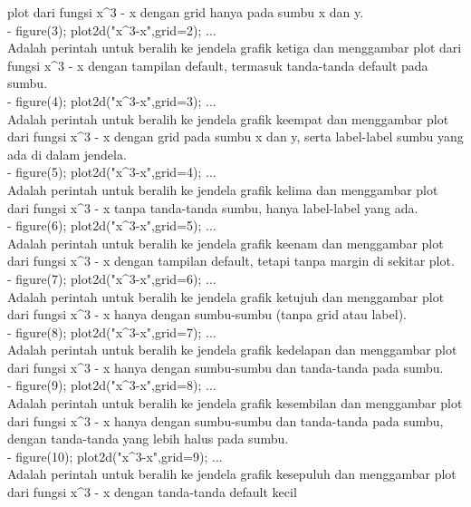 \documentclass{article}
\begin{document}
\begin{eulernotebook}
\begin{eulercomment}
\begin{eulercomment}
\begin{eulercomment}
\begin{eulercomment}
\begin{eulercomment}
plot dari fungsi x\textasciicircum{}3 - x dengan grid hanya pada sumbu x dan y.\\
- figure(3); plot2d("x\textasciicircum{}3-x",grid=2); ...\\
Adalah perintah untuk beralih ke jendela grafik ketiga dan menggambar
plot dari fungsi x\textasciicircum{}3 - x dengan tampilan default, termasuk tanda-tanda
default pada sumbu.\\
- figure(4); plot2d("x\textasciicircum{}3-x",grid=3); ...\\
Adalah perintah untuk beralih ke jendela grafik keempat dan menggambar
plot dari fungsi x\textasciicircum{}3 - x dengan grid pada sumbu x dan y, serta
label-label sumbu yang ada di dalam jendela.\\
- figure(5); plot2d("x\textasciicircum{}3-x",grid=4); ...\\
Adalah perintah untuk beralih ke jendela grafik kelima dan menggambar
plot dari fungsi x\textasciicircum{}3 - x tanpa tanda-tanda sumbu, hanya label-label
yang ada.\\
- figure(6); plot2d("x\textasciicircum{}3-x",grid=5); ...\\
Adalah perintah untuk beralih ke jendela grafik keenam dan menggambar
plot dari fungsi x\textasciicircum{}3 - x dengan tampilan default, tetapi tanpa margin
di sekitar plot.\\
- figure(7); plot2d("x\textasciicircum{}3-x",grid=6); ...\\
Adalah perintah untuk beralih ke jendela grafik ketujuh dan menggambar
plot dari fungsi x\textasciicircum{}3 - x hanya dengan sumbu-sumbu (tanpa grid atau
label).\\
- figure(8); plot2d("x\textasciicircum{}3-x",grid=7); ...\\
Adalah perintah untuk beralih ke jendela grafik kedelapan dan
menggambar plot dari fungsi x\textasciicircum{}3 - x hanya dengan sumbu-sumbu dan
tanda-tanda pada sumbu.\\
- figure(9); plot2d("x\textasciicircum{}3-x",grid=8); ...\\
Adalah perintah untuk beralih ke jendela grafik kesembilan dan
menggambar plot dari fungsi x\textasciicircum{}3 - x hanya dengan sumbu-sumbu dan
tanda-tanda pada sumbu, dengan tanda-tanda yang lebih halus pada
sumbu.\\
- figure(10); plot2d("x\textasciicircum{}3-x",grid=9); ...\\
Adalah perintah untuk beralih ke jendela grafik kesepuluh dan
menggambar plot dari fungsi x\textasciicircum{}3 - x dengan tanda-tanda default kecil

\end{eulercomment}
\end{eulercomment}
\end{eulercomment}
\end{eulercomment}
\end{eulercomment}
\end{eulernotebook}
\end{document}
